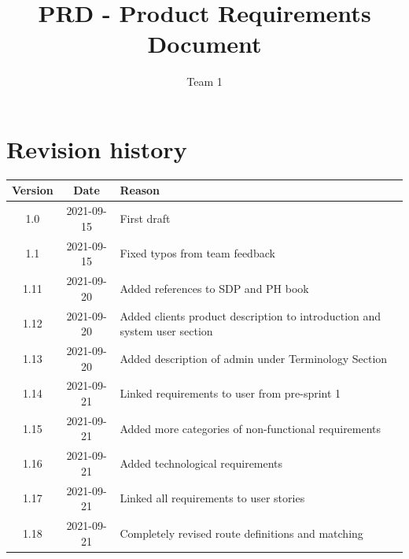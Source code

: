 \documentclass{article}
\title{PRD - Product Requirements Document}
\author{Team 1}
\begin{document}
\date{}
\maketitle
\thispagestyle{fancy}
\newpage

\tableofcontents

\section*{Revision history}
\begin{tabular}{ |c|c|l| } 
 \hline
 Version & Date & Reason \\ \hline
 1.0 & 2021-09-15 & First draft \\ 
 1.1 & 2021-09-15 & Fixed typos from team feedback \\ 
 1.11 & 2021-09-20 & Added references to SDP and PH book\\
 1.12 & 2021-09-20 & Added clients product description to introduction and system user section \\
 1.13 & 2021-09-20 & Added description of admin under Terminology Section\\
 1.14 & 2021-09-21 & Linked requirements to user from pre-sprint 1\\
 1.15 & 2021-09-21 & Added more categories of non-functional requirements\\
 1.16 & 2021-09-21 & Added technological requirements\\
 1.17 & 2021-09-21 & Linked all requirements to user stories\\
 1.18 & 2021-09-21 & Completely revised route definitions and matching\\
 \hline
\end{tabular}

\newpage
\end{document}
